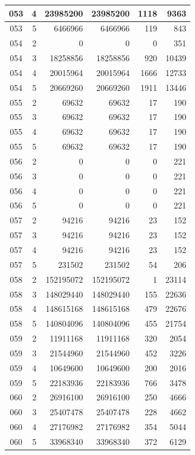 \begin{longtable}{|c|r|r|r|r|r|}
\hline
053 & 4 & 23985200 & 23985200 & 1118 & 9363 \\
\hline
053 & 5 & 6466966 & 6466966 & 119 & 843 \\
\hline
054 & 2 & 0 & 0 & 0 & 351 \\
\hline
054 & 3 & 18258856 & 18258856 & 920 & 10439 \\
\hline
054 & 4 & 20015964 & 20015964 & 1666 & 12733 \\
\hline
054 & 5 & 20669260 & 20669260 & 1911 & 13446 \\
\hline
055 & 2 & 69632 & 69632 & 17 & 190 \\
\hline
055 & 3 & 69632 & 69632 & 17 & 190 \\
\hline
055 & 4 & 69632 & 69632 & 17 & 190 \\
\hline
055 & 5 & 69632 & 69632 & 17 & 190 \\
\hline
056 & 2 & 0 & 0 & 0 & 221 \\
\hline
056 & 3 & 0 & 0 & 0 & 221 \\
\hline
056 & 4 & 0 & 0 & 0 & 221 \\
\hline
056 & 5 & 0 & 0 & 0 & 221 \\
\hline
057 & 2 & 94216 & 94216 & 23 & 152 \\
\hline
057 & 3 & 94216 & 94216 & 23 & 152 \\
\hline
057 & 4 & 94216 & 94216 & 23 & 152 \\
\hline
057 & 5 & 231502 & 231502 & 54 & 206 \\
\hline
058 & 2 & 152195072 & 152195072 & 1 & 23114 \\
\hline
058 & 3 & 148029440 & 148029440 & 155 & 22636 \\
\hline
058 & 4 & 148615168 & 148615168 & 479 & 22676 \\
\hline
058 & 5 & 140804096 & 140804096 & 455 & 21754 \\
\hline
059 & 2 & 11911168 & 11911168 & 320 & 2054 \\
\hline
059 & 3 & 21544960 & 21544960 & 452 & 3226 \\
\hline
059 & 4 & 10649600 & 10649600 & 200 & 2016 \\
\hline
059 & 5 & 22183936 & 22183936 & 766 & 3478 \\
\hline
060 & 2 & 26916100 & 26916100 & 250 & 4666 \\
\hline
060 & 3 & 25407478 & 25407478 & 228 & 4662 \\
\hline
060 & 4 & 27176982 & 27176982 & 354 & 5044 \\
\hline
060 & 5 & 33968340 & 33968340 & 372 & 6129 \\

\end{longtable}
